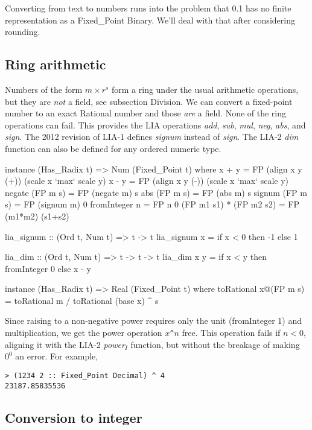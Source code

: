 \documentclass{article}
\begin{document}
Converting from text to numbers runs into the problem that
0.1 has no finite representation as a Fixed\_Point Binary.
We'll deal with that after considering rounding.

\subsection{Ring arithmetic}

Numbers of the form $m\times r^s$ form a ring under the usual
arithmetic operations, but they are \emph{not} a field, see
subsection Division.
We can convert a fixed-point number to an exact Rational number and
those \emph{are} a field.  None of the ring operations can fail.
This provides the LIA operations {\it add}, {\it sub}, {\it mul},
{\it neg}, {\it abs}, and {\it sign}.  The 2012 revision of LIA-1
defines {\it signum} instead of {\it sign}.  The LIA-2 {\it dim}
function can also be defined for any ordered numeric type.

\begin{code}
instance (Has_Radix t) => Num (Fixed_Point t)
  where
    x + y = FP (align x y (+)) (scale x `max` scale y)
    x - y = FP (align x y (-)) (scale x `max` scale y)
    negate (FP m s) = FP (negate m) s
    abs    (FP m s) = FP (abs    m) s
    signum (FP m s) = FP (signum m) 0
    fromInteger n   = FP n 0
    (FP m1 s1) * (FP m2 s2)  = FP (m1*m2) (s1+s2)

lia_signum :: (Ord t, Num t) => t -> t
lia_signum x = if x < 0 then -1 else 1

lia_dim :: (Ord t, Num t) => t -> t -> t
lia_dim x y = if x < y then fromInteger 0 else x - y

instance (Has_Radix t) => Real (Fixed_Point t)
  where
    toRational x@(FP m s) = toRational m / toRational (base x) ^ s
\end{code}

Since raising to a non-negative power requires only the unit
(fromInteger 1) and multiplication, we get the power operation
$x$\verb|^|$n$ free.  This operation fails if $n<0$, aligning
it with the LIA-2 {\it power${}_I$} function, but without the
breakage of making $0^0$ an error.  For example,
\begin{verbatim}
> (1234 2 :: Fixed_Point Decimal) ^ 4
23187.85835536
\end{verbatim}

\subsection{Conversion to integer}
\end{document}

